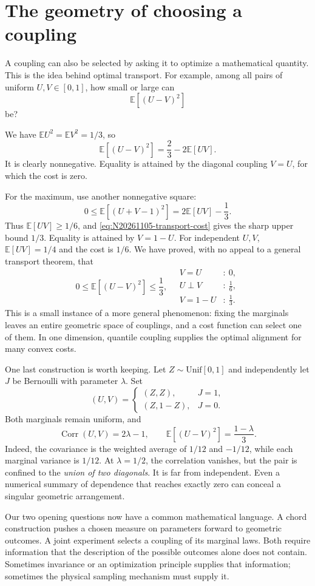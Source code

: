 \section{The geometry of choosing a coupling}

A coupling can also be selected by asking it to optimize a mathematical quantity. This is the idea behind optimal transport. For example, among all pairs of uniform \(U,V\in[0,1]\), how small or large can
\[
 \mathbb E[(U-V)^2]
\]
be?

We have \(\mathbb EU^2=\mathbb EV^2=1/3\), so
\begin{equation}
 \mathbb E[(U-V)^2]=\frac23-2\mathbb E[UV].
 \label{eq:N20261105-transport-cost}
\end{equation}
It is clearly nonnegative. Equality is attained by the diagonal coupling \(V=U\), for which the cost is zero.

For the maximum, use another nonnegative square:
\[
 0\leq\mathbb E[(U+V-1)^2]
 =2\mathbb E[UV]-\frac13.
\]
Thus \(\mathbb E[UV]\geq1/6\), and \eqref{eq:N20261105-transport-cost} gives the sharp upper bound \(1/3\). Equality is attained by \(V=1-U\). For independent \(U,V\), \(\mathbb E[UV]=1/4\) and the cost is \(1/6\). We have proved, with no appeal to a general transport theorem, that
\[
 \boxed{\quad
 0\leq\mathbb E[(U-V)^2]\leq\frac13,\quad
 \begin{aligned}
 V=U&:\ 0,\\
 U\perp V&:\ \frac16,\\
 V=1-U&:\ \frac13.
 \end{aligned}\quad}
\]
This is a small instance of a more general phenomenon: fixing the marginals leaves an entire geometric space of couplings, and a cost function can select one of them. In one dimension, quantile coupling supplies the optimal alignment for many convex costs.

One last construction is worth keeping. Let \(Z\sim\mathrm{Unif}[0,1]\) and independently let \(J\) be Bernoulli with parameter \(\lambda\). Set
\[
 (U,V)=
 \begin{cases}
 (Z,Z),&J=1,\\
 (Z,1-Z),&J=0.
 \end{cases}
\]
Both marginals remain uniform, and
\[
 \operatorname{Corr}(U,V)=2\lambda-1,\qquad
 \mathbb E[(U-V)^2]=\frac{1-\lambda}{3}.
\]
Indeed, the covariance is the weighted average of \(1/12\) and \(-1/12\), while each marginal variance is \(1/12\). At \(\lambda=1/2\), the correlation vanishes, but the pair is confined to the \emph{union of two diagonals}. It is far from independent. Even a numerical summary of dependence that reaches exactly zero can conceal a singular geometric arrangement.

Our two opening questions now have a common mathematical language. A chord construction pushes a chosen measure on parameters forward to geometric outcomes. A joint experiment selects a coupling of its marginal laws. Both require information that the description of the possible outcomes alone does not contain. Sometimes invariance or an optimization principle supplies that information; sometimes the physical sampling mechanism must supply it.
